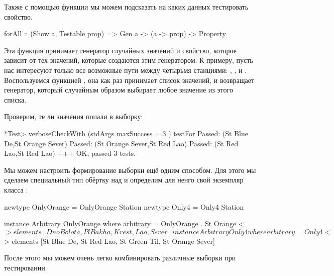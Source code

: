 Также с помощью функции  мы можем 
подсказать  на каких данных тестировать свойство.


\begin{code}
forAll :: (Show a, Testable prop) => Gen a -> (a -> prop) -> Property
\end{code}

Эта функция принимает генератор случайных значений 
и свойство, которое зависит от тех значений, которые 
создаются этим генератором. К примеру, пусть нас интересуют только все
возможные пути между четырьмя станциями: , ,
  и .
 Воспользуемся функцией , она как раз 
 принимает список значений, и возвращает генератор, который
 случайным образом выбирает любое значение из этого списка.


Проверим, те ли значения попали в выборку:

\begin{code}
*Test> verboseCheckWith (stdArgs{ maxSuccess = 3 }) testFor
Passed:  
(St Blue De,St Orange Sever)
Passed: 
(St Orange Sever,St Red Lao)
Passed:  
(St Red Lao,St Red Lao)
+++ OK, passed 3 tests.
\end{code}

Мы можем настроить формирование выборки ещё одним способом.
Для этого мы сделаем специальный тип обёртку над 
и определим для ненго свой экземпляр класса :

\begin{code}
newtype OnlyOrange = OnlyOrange Station
newtype Only4      = Only4       Station

instance Arbitrary OnlyOrange where
    arbitrary = OnlyOrange . St Orange <$> 
        elements [DnoBolota, PlBakha, Krest, Lao, Sever]

instance Arbitrary Only4 where
    arbitrary = Only4 <$> elements [St Blue De, St Red Lao, 
                    St Green Til, St Orange Sever]
\end{code}

После этого мы можем очень легко комбинировать
различные выборки при тестировании.


